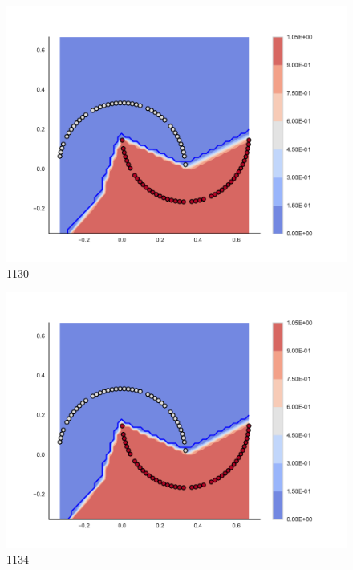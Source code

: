 \begin{subfigure}[b]{0.09\textwidth}
    \includegraphics[clip, trim=2.35cm 1.75cm 4.5cm 0cm,width=\textwidth]{img/convergence/1130.pdf}
    \caption{1130}
    \label{fig:convergence_1130}
\end{subfigure}
%
\begin{subfigure}[b]{0.09\textwidth}
    \includegraphics[clip, trim=2.35cm 1.75cm 4.5cm 0cm,width=\textwidth]{img/convergence/1134.pdf}
    \caption{1134}
    \label{fig:convergence_1134}
\end{subfigure}
%
